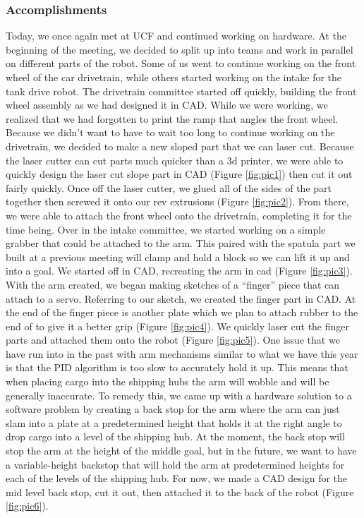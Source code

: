\subsubsection*{Accomplishments}
Today, we once again met at UCF and continued working on hardware. At the beginning of the meeting, we decided to split up into teams and work in parallel on different parts of the robot. Some of us went to continue working on the front wheel of the car drivetrain, while others started working on the intake for the tank drive robot. 
The drivetrain committee started off quickly, building the front wheel assembly as we had designed it in CAD. While we were working, we realized that we had forgotten to print the ramp that angles the front wheel. Because we didn’t want to have to wait too long to continue working on the drivetrain, we decided to make a new sloped part that we can laser cut. Because the laser cutter can cut parts much quicker than a 3d printer, we were able to quickly design the laser cut slope part in CAD (Figure \ref{fig:pic1}) then cut it out fairly quickly. Once off the laser cutter, we glued all of the sides of the part together then screwed it onto our rev extrusions (Figure \ref{fig:pic2}). From there, we were able to attach the front wheel onto the drivetrain, completing it for the time being.
Over in the intake committee, we started working on a simple grabber that could be attached to the arm. This paired with the spatula part we built at a previous meeting will clamp and hold a block so we can lift it up and into a goal. We started off in CAD, recreating the arm in cad (Figure \ref{fig:pic3}). With the arm created, we began making sketches of  a “finger” piece that can attach to a servo. Referring to our sketch, we created the finger part in CAD. At the end of the finger piece is another plate which we plan to attach rubber to the end of to give it a better grip (Figure \ref{fig:pic4}). We quickly laser cut the finger parts and attached them onto the robot (Figure \ref{fig:pic5}).
One issue that we have run into in the past with arm mechanisms similar to what we have this year is that the PID algorithm is too slow to accurately hold it up. This means that when placing cargo into the shipping hubs the arm will wobble and will be generally inaccurate. To remedy this, we came up with a hardware solution to a software problem by creating a back stop for the arm where the arm can just slam into a plate at a predetermined height that holds it at the right angle to drop cargo into a level of the shipping hub. At the moment, the back stop will stop the arm at the height of the middle goal, but in the future, we want to have a variable-height backstop that will hold the arm at predetermined heights for each of the levels of the shipping hub. For now, we made a CAD design for the mid level back stop, cut it out, then attached it to the back of the robot (Figure \ref{fig:pic6}).

